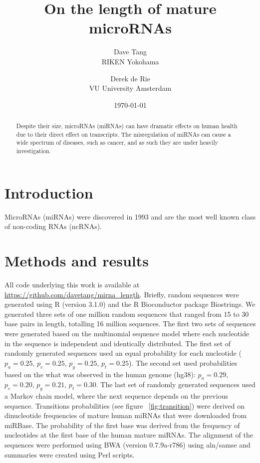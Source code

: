 \documentclass{article}
\title{On the length of mature microRNAs}
\author{Dave Tang  \\
	RIKEN Yokohama \\
	\and 
	Derek de Rie \\
	VU University Amsterdam \\
	}
\date{\today}
\begin{document}
\maketitle

\begin{abstract}
Despite their size, microRNAs (miRNAs) can have dramatic effects on human health due to their direct effect on transcripts. The misregulation of miRNAs can cause a wide spectrum of diseases, such as cancer, and as such they are under heavily investigation.

\end{abstract}

\section{Introduction}

MicroRNAs (miRNAs) were discovered in 1993\cite{pmid8252621} and are the most well known class of non-coding RNAs (ncRNAs).

\section{Methods and results}\label{method_and_result}

All code underlying this work is available at \url{https://github.com/davetang/mirna_length}. Briefly, random sequences were generated using R (version 3.1.0) and the R Bioconductor package Biostrings\cite{biostrings_package}. We generated three sets of one million random sequences that ranged from 15 to 30 base pairs in length, totalling 16 million sequences. The first two sets of sequences were generated based on the multinomial sequence model where each nucleotide in the sequence is independent and identically distributed. The first set of randomly generated sequences used an equal probability for each nucleotide ($p_{a} = 0.25$, $p_{c} = 0.25$, $p_{g} = 0.25$, $p_{t} = 0.25$). The second set used probabilities based on the what was observed in the human genome (hg38): $p_{a} = 0.29$, $p_{c} = 0.20$, $p_{g} = 0.21$, $p_{t} = 0.30$. The last set of randomly generated sequences used a Markov chain model, where the next sequence depends on the previous sequence. Transitions probabilities (see figure ~\ref{fig:transition}) were derived on dinucleotide frequencies of mature human miRNAs that were downloaded from miRBase\cite{pmid21037258}. The probability of the first base was derived from the frequency of nucleotides at the first base of the human mature miRNAs. The alignment of the sequences were performed using BWA\cite{pmid19451168} (version 0.7.9a-r786) using aln/samse and summaries were created using Perl scripts.
\end{document}
